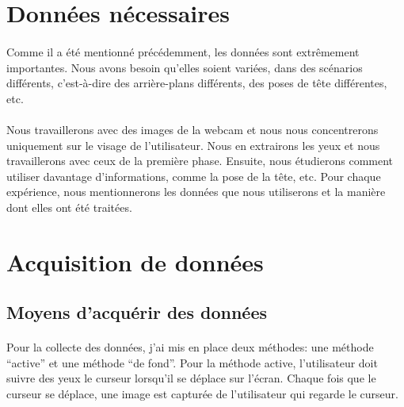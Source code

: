 \section{Données nécessaires}
\paragraph{}
Comme il a été mentionné précédemment, les données sont extrêmement importantes.
Nous avons besoin qu'elles soient variées, dans des scénarios différents, c'est-à-dire des arrière-plans différents, des poses de tête différentes, etc.

\paragraph{}
Nous travaillerons avec des images de la webcam et nous nous concentrerons uniquement sur le visage de l'utilisateur.
Nous en extrairons les yeux et nous travaillerons avec ceux de la première phase.
Ensuite, nous étudierons comment utiliser davantage d'informations, comme la pose de la tête, etc.
Pour chaque expérience, nous mentionnerons les données que nous utiliserons et la manière dont elles ont été traitées.

\section{Acquisition de données}

\subsection{Moyens d'acquérir des données}
\paragraph{}
Pour la collecte des données, j'ai mis en place deux méthodes: une méthode ``active'' et une méthode ``de fond''.
Pour la méthode active, l'utilisateur doit suivre des yeux le curseur lorsqu'il se déplace sur l'écran.
Chaque fois que le curseur se déplace, une image est capturée de l'utilisateur qui regarde le curseur.
